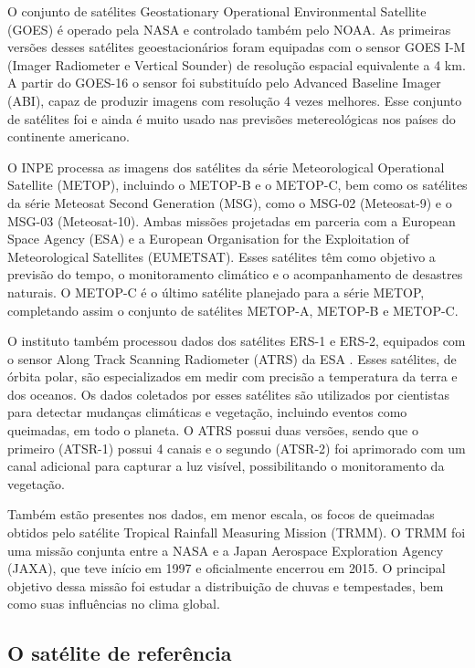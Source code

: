 \documentclass[cic,tc]{iiufrgs}
\begin{document}
O conjunto de satélites Geostationary Operational Environmental Satellite (GOES) é operado pela NASA e controlado também pelo NOAA. As primeiras versões desses satélites geoestacionários foram equipadas com o sensor GOES I-M (Imager Radiometer e Vertical Sounder) de resolução espacial equivalente a 4 km. A partir do GOES-16 o sensor foi substituído pelo Advanced Baseline Imager (ABI), capaz de produzir imagens com resolução 4 vezes melhores. Esse conjunto de satélites foi e ainda é muito usado nas previsões metereológicas nos países do continente americano.

O INPE processa as imagens dos satélites da série Meteorological Operational Satellite (METOP), incluindo o METOP-B e o METOP-C, bem como os satélites da série Meteosat Second Generation (MSG), como o MSG-02 (Meteosat-9) e o MSG-03 (Meteosat-10). Ambas missões projetadas em parceria com a European Space Agency (ESA) e a European Organisation for the Exploitation of Meteorological Satellites (EUMETSAT). Esses satélites têm como objetivo a previsão do tempo, o monitoramento climático e o acompanhamento de desastres naturais. O METOP-C é o último satélite planejado para a série METOP, completando assim o conjunto de satélites METOP-A, METOP-B e METOP-C.

O instituto também processou dados dos satélites ERS-1 e ERS-2, equipados com o sensor  Along Track Scanning Radiometer (ATRS) da ESA \cite{EmbrapaSatelites}. Esses satélites, de órbita polar, são especializados em medir com precisão a temperatura da terra e dos oceanos. Os dados coletados por esses satélites são utilizados por cientistas para detectar mudanças climáticas e vegetação, incluindo eventos como queimadas, em todo o planeta. O ATRS possui duas versões, sendo que o primeiro (ATSR-1) possui 4 canais e o segundo (ATSR-2) foi aprimorado com um canal adicional para capturar a luz visível, possibilitando o monitoramento da vegetação. 

Também estão presentes nos dados, em menor escala, os focos de queimadas obtidos pelo satélite Tropical Rainfall Measuring Mission (TRMM). O TRMM foi uma missão conjunta entre a NASA e a Japan Aerospace Exploration Agency (JAXA), que teve início em 1997 e oficialmente encerrou em 2015. O principal objetivo dessa missão foi estudar a distribuição de chuvas e tempestades, bem como suas influências no clima global.

\subsection*{O satélite de referência}
\end{document}
